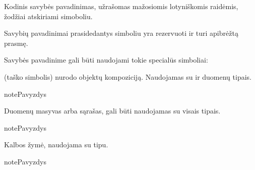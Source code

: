\documentclass[letterpaper,10pt,lithuanian]{sphinxmanual}
\begin{document}
\begin{fulllineitems}
\label{\detokenize{formatas:property}}
\pysigstartsignatures
\pysigline
{}
\pysigstopsignatures
\sphinxAtStartPar
{}

\sphinxAtStartPar
Kodinis savybės pavadinimas, užrašomas mažosiomis lotyniškomis raidėmis,
žodžiai atskiriami \sphinxcode{\sphinxupquote{\_}} simoboliu.

\sphinxAtStartPar
Savybių pavadinimai prasidedantys \sphinxcode{\sphinxupquote{\_}} simboliu yra rezervuoti ir turi
apibrėžtą prasmę.

\sphinxAtStartPar
Savybės pavadinime gali būti naudojami tokie specialūs simboliai:
\begin{description}
\sphinxAtStartPar
(taško simbolis) nurodo objektų kompoziciją. Naudojamas su
{\hyperref[\detokenize{tipai:type.ref}]{}} ir {\hyperref[\detokenize{tipai:type.object}]{}} duomenų tipais.

\begin{sphinxadmonition}{note}{Pavyzdys}

\begin{DUlineblock}{0em}
\item[] 
\end{DUlineblock}
\end{sphinxadmonition}

\sphinxlineitem{{[}{]}}
\sphinxAtStartPar
Duomenų masyvas arba sąrašas, gali būti naudojamas su visais tipais.

\begin{sphinxadmonition}{note}{Pavyzdys}

\begin{DUlineblock}{0em}
\item[] 
\end{DUlineblock}
\end{sphinxadmonition}

\end{description}
\begin{description}
\sphinxAtStartPar
Kalbos žymė, naudojama su {\hyperref[\detokenize{tipai:type.text}]{}} tipu.

\begin{sphinxadmonition}{note}{Pavyzdys}


\end{sphinxadmonition}
\end{description}
\end{fulllineitems}
\end{document}
